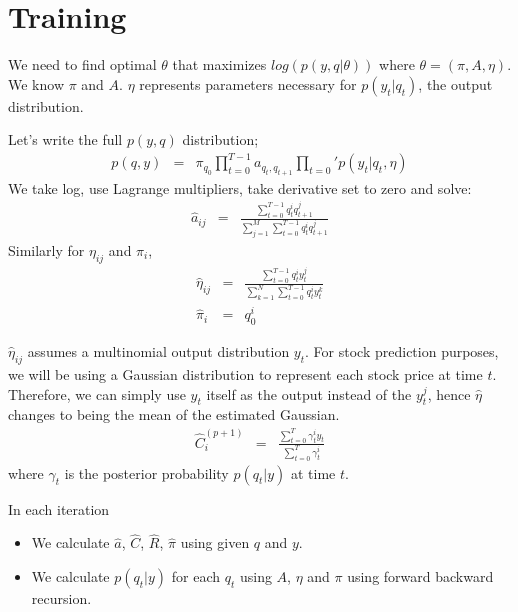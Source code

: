 
\section{Training}

We need to find optimal $\theta$ that maximizes $log (p(y,q|\theta))$ where
$\theta = (\pi,A,\eta)$. We know $\pi$ and $A$. $\eta$ represents parameters
necessary for $p(y_t|q_t)$, the output distribution.

Let's write the full $p(y,q)$ distribution;
\begin{eqnarray*}
p(q,y) &=& \pi_{q_0} \prod_{t=0}^{T-1} a_{q_t,q_{t+1}} \prod_{t=0}' p(y_t|q_t,\eta)
\end{eqnarray*}
We take log, use Lagrange multipliers, take derivative set to zero and solve:
{\small
\begin{eqnarray*}
\hat{a}_{ij}  &=& \frac{\sum_{t=0}^{T-1} q_t^i q_{t+1}^j}{\sum_{j=1}^M \sum_{t=0}^{T-1} q_t^i q_{t+1}^j} 
\end{eqnarray*}}
Similarly for $\eta_{ij}$ and $\pi_i$,
\begin{eqnarray*}
\hat{\eta}_{ij} &=& \frac{\sum_{t=0}^{T-1} q_t^i y_t^j}{\sum_{k=1}^N
\sum_{t=0}^{T-1} q_t^i y_t^k} \\
\hat{\pi}_i &=& q_0^i
\end{eqnarray*}

$\hat{\eta}_{ij}$ assumes a multinomial output distribution $y_t$. For stock
prediction purposes, we will be using a Gaussian distribution to represent
each stock price at time $t$. Therefore, we can simply use $y_t$ itself as the
output instead of the $y_t^j$, hence $\hat{\eta}$ changes to being the mean of
the estimated Gaussian.
\begin{eqnarray*}
\hat{C}_{i}^{(p+1)} &=& \frac{\sum_{t=0}^T\gamma_{t}^i y_t}{\sum_{t=0}^T\gamma_{t}^i}
\end{eqnarray*}
where $\gamma_{t}$ is the posterior probability $p(q_t|y)$ at time $t$.

In each iteration

\begin{itemize}
   \item We calculate $\hat{a}$, $\hat{C}$, $\hat{R}$, $\hat{\pi}$ using given
     $q$ and $y$.
   \item We calculate $p(q_t|y)$ for each $q_t$ using $A$, $\eta$ and $\pi$ using
   forward backward recursion.
\end{itemize}

